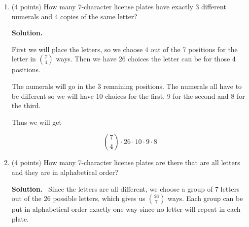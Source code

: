 \documentclass[10pt,letterpaper]{article}
\newenvironment{solution}
  {\par\noindent\textbf{Solution.}\ }
  {\par}
\begin{document}
\begin{enumerate}
\begin{enumerate}
\emph{Ex: AAA3331, P33T3TT, ...}

\begin{solution}
    First we choose the character that appears 3 times in \(36\) possible ways, now we choose its 3 positions in \(\binom{7}{3}\) ways. 
    
    Then we choose a different character for the second group of 3 in \(35\) possible ways since one character was already chosen, thus choosing 3 of the remaining 4 positions in \(\binom{4}{3}\) ways.

    The final position can contain any of the remaining \(34\), which gives us 

    \[36\cdot \binom{7}{3} \cdot 35 \cdot \binom{4}{3}\cdot 34\]

    However this counts every plate twice since both groups are the same size it doesn't matter which one we choose first.

    Thus we divide all by 2 

    \[\frac{36\cdot \binom{7}{3} \cdot 35 \cdot \binom{4}{3}\cdot 34}{2}\]
\end{solution}



\item
(4 points)
How many 7-character license plates have exactly 3 different numerals and 4 copies of the same letter?

\begin{solution}

First we will place the letters, so we choose 4 out of the 7 positions for the letter in \(\binom{7}{4}\) ways. Then we have 26 choices the letter can be for those 4 positions.

The numerals will go in the 3 remaining positions. The numerals all have to be different so we will have 10 choices for the first, 9 for the second and 8 for the third.

Thus we will get 

\[\binom{7}{4}\cdot 26\cdot 10\cdot 9\cdot 8\]

\end{solution}

\item
(4 points)
How many 7-character license plates are there that are all letters and they are in alphabetical order?

\begin{solution}
    Since the letters are all different, we choose a group of 7 letters out of the 26 possible letters, which gives us \(\binom{26}{7}\) ways. Each group can be put in alphabetical order exactly one way since no letter will repeat in each plate.


\end{solution}
\end{enumerate}
\end{enumerate}
\end{document}
